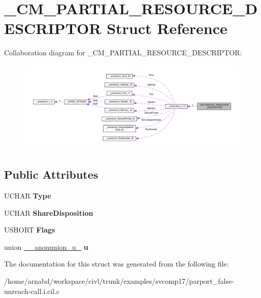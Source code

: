 \hypertarget{struct__CM__PARTIAL__RESOURCE__DESCRIPTOR}{}\section{\+\_\+\+C\+M\+\_\+\+P\+A\+R\+T\+I\+A\+L\+\_\+\+R\+E\+S\+O\+U\+R\+C\+E\+\_\+\+D\+E\+S\+C\+R\+I\+P\+T\+O\+R Struct Reference}
\label{struct__CM__PARTIAL__RESOURCE__DESCRIPTOR}


Collaboration diagram for \+\_\+\+C\+M\+\_\+\+P\+A\+R\+T\+I\+A\+L\+\_\+\+R\+E\+S\+O\+U\+R\+C\+E\+\_\+\+D\+E\+S\+C\+R\+I\+P\+T\+O\+R\+:
\nopagebreak
\begin{figure}[H]
\begin{center}
\leavevmode
\includegraphics[width=350pt]{struct__CM__PARTIAL__RESOURCE__DESCRIPTOR__coll__graph}
\end{center}
\end{figure}
\subsection*{Public Attributes}
\begin{DoxyCompactItemize}
\item 
\hypertarget{struct__CM__PARTIAL__RESOURCE__DESCRIPTOR_aa28bee4b504a2b1d4d8ec03d78aa2429}{}U\+C\+H\+A\+R {\bfseries Type}\label{struct__CM__PARTIAL__RESOURCE__DESCRIPTOR_aa28bee4b504a2b1d4d8ec03d78aa2429}

\item 
\hypertarget{struct__CM__PARTIAL__RESOURCE__DESCRIPTOR_a02eec1ea2abab1de944ebc5c28fa42f9}{}U\+C\+H\+A\+R {\bfseries Share\+Disposition}\label{struct__CM__PARTIAL__RESOURCE__DESCRIPTOR_a02eec1ea2abab1de944ebc5c28fa42f9}

\item 
\hypertarget{struct__CM__PARTIAL__RESOURCE__DESCRIPTOR_ab1b911e76afbc6b4975330e65f2e5e45}{}U\+S\+H\+O\+R\+T {\bfseries Flags}\label{struct__CM__PARTIAL__RESOURCE__DESCRIPTOR_ab1b911e76afbc6b4975330e65f2e5e45}

\item 
\hypertarget{struct__CM__PARTIAL__RESOURCE__DESCRIPTOR_a1714f824894ab7226f130d870e52b8bb}{}union \hyperlink{union____anonunion__u__15}{\+\_\+\+\_\+anonunion\+\_\+u\+\_} {\bfseries u}\label{struct__CM__PARTIAL__RESOURCE__DESCRIPTOR_a1714f824894ab7226f130d870e52b8bb}

\end{DoxyCompactItemize}


The documentation for this struct was generated from the following file\+:\begin{DoxyCompactItemize}
\item 
/home/arnabd/workspace/civl/trunk/examples/svcomp17/parport\+\_\+false-\/unreach-\/call.\+i.\+cil.\+c\end{DoxyCompactItemize}
